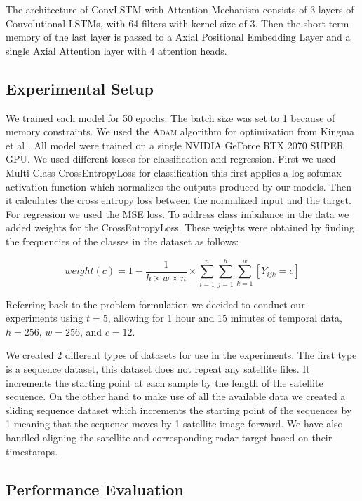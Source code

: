 The architecture of ConvLSTM with Attention Mechanism consists of 3 layers of Convolutional LSTMs,
with 64 filters with kernel size of 3. Then the short term memory of the last layer is passed to a Axial Positional Embedding Layer
and a single Axial Attention layer with 4 attention heads.  

\subsection{Experimental Setup}
We trained each model for 50 epochs. The batch size was set to 1 because of memory constraints. We used the \textsc{Adam} algorithm for optimization from Kingma et al \cite{kingma-2014}.
All model were trained on a single NVIDIA GeForce RTX 2070 SUPER GPU. We used different losses for classification and regression.
First we used Multi-Class CrossEntropyLoss for classification this first applies a log softmax activation function which normalizes the
outputs produced by our models. Then it calculates the cross entropy loss between the normalized input and the target.
For regression we used the MSE loss. To address class imbalance in the data we added weights for the CrossEntropyLoss. These weights were
obtained by finding the frequencies of the classes in the dataset as follows:

\begin{equation}
  weight(c) = 1 - \frac{1}{h\times w \times n} \times \sum_{i=1}^n \sum_{j=1}^h \sum_{k=1}^w [Y_{ijk} = c]
\end{equation}

Referring back to the problem formulation we decided to conduct our experiments using $t = 5$, allowing for 1 hour and 15 minutes of temporal data, $h = 256$, $w = 256$, and $c = 12$.

We created 2 different types of datasets for use in the experiments.
The first type is a sequence dataset, this dataset does not repeat any satellite files. It increments the starting point at each sample
by the length of the satellite sequence. On the other hand to make use of all the available data we created a sliding sequence dataset which increments the starting point of the sequences by 1 meaning that the sequence moves by
1 satellite image forward. We have also handled aligning the satellite and corresponding radar target based on their timestamps. 

\subsection{Performance Evaluation}

